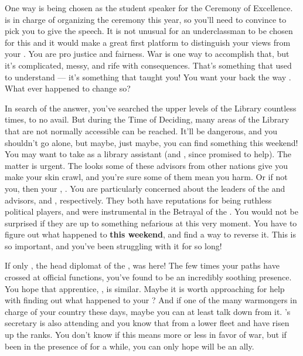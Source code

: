 \documentclass[char]{GL2020}
\begin{document}
One way is being chosen as the student speaker for the Ceremony of Excellence. \cMusic{\full} is in charge of organizing the ceremony this year, so you'll need to convince \cMusic{\them} to pick you to give the speech. It is not unusual for an underclassman to be chosen for this and it would make a great first platform to distinguish your views from your \cLoud{\parent}. You are pro justice and fairness. War is one way to accomplish that, but it's complicated, messy, and rife with consequences. That's something that \cLoud{} used to understand — it's something that \cLoud{\they} taught you! You want your \cLoud{\parent} back the way \cLoud{\theywere}. What ever happened to change \cLoud{\them} so?

In search of the answer, you've searched the upper levels of the Library countless times, to no avail. But during the Time of Deciding, many areas of the Library that are not normally accessible can be reached. It'll be dangerous, and you shouldn't go alone, but maybe, just maybe, you can find something this weekend! You may want to take \cPresident{} as \cPresident{\theyare} a library assistant (and \cHeir{}, since \cHeir{\they} promised to help). The matter is urgent. The looks some of these advisors from other nations give you make your skin crawl, and you're sure some of them mean you harm. Or if not you, then your \cLoud{\parent}, \cLoud{}. You are particularly concerned about the leaders of the \pTech{} and \pFarm{} advisors, \cDiplomat{\full} and \cEvil{\full}, respectively. They both have reputations for being ruthless political players, and were instrumental in the Betrayal of the \pShip{}. You would not be surprised if they are up to something nefarious at this very moment. You have to figure out what happened to \cLoud{} \textbf{this weekend}, and find a way to reverse it. This is so important, and you've been struggling with it for so long!

If only \cHeadDiplomat{\full}, the head diplomat of the \pShip{}, was here! The few times your paths have crossed at official functions, you've found \cHeadDiplomat{\them} to be an incredibly soothing presence. You hope that \cHeadDiplomat{\their} apprentice, \cJuniorStatesman{\full}, is similar. Maybe it is worth approaching \cJuniorStatesman{\them} for help with finding out what happened to your \cLoud{\parent}? And if \cJuniorStatesman{\theyare} one of the many warmongers in charge of your country these days, maybe you can at least talk \cJuniorStatesman{\them} down from it. \cHeadDiplomat{}’s secretary \cChupLeader{\full} is also attending and you know that \cChupLeader{\theyare} from a lower fleet and have risen up the ranks. You don’t know if this means \cChupLeader{\theyare} more or less in favor of war, but if \cChupLeader{\they{} \have} been in the presence of \cHeadDiplomat{} for a while, you can only hope \cChupLeader{\they} will be an ally.  
\end{document}
